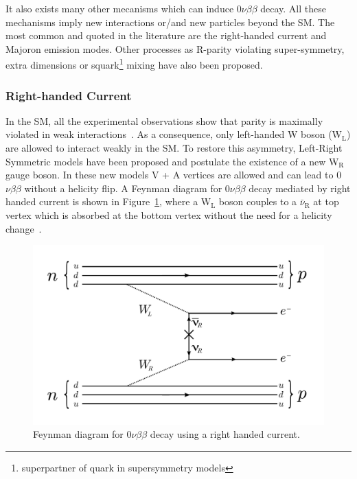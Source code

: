 \documentclass[main.tex]{subfiles}
\begin{document}
\NI It also exists many other mecanisms which can induce 0$\nu\beta\beta$ decay. All these mechanisms imply new interactions or/and new particles beyond the SM.  The most common and quoted in the literature are the right-handed current and Majoron emission modes. Other processes as R-parity violating super-symmetry, extra dimensions or squark\footnote{superpartner of quark in supersymmetry models} mixing have also been proposed.




\subsubsection{Right-handed Current}


\NI In the SM, all the experimental observations show that parity is maximally violated in weak interactions~\cite{Wu,NeutrinoHelicity}. As a consequence,  only left-handed W boson (W$_\text{L}$) are allowed to interact weakly in the SM. To restore this asymmetry, Left-Right Symmetric models have been proposed and postulate the existence of a new W$_\text{R}$ gauge boson. In these new models V + A vertices are allowed and can lead to 0$\nu\beta\beta$ without a helicity flip. A Feynman diagram for 0$\nu\beta\beta$ decay mediated by right handed current is shown in Figure~\ref{OnbbFeynmanDiagramRHC}, where a W$_\text{L}$ boson couples to a $\bar{\nu}_\text{R}$ at top vertex which is absorbed at the bottom vertex without the need for a helicity change~\cite{DBDRightHandedCurrent}.


\begin{figure}[h!]
\begin{center}
\includegraphics[scale=0.45]{pictures/Chap2/0nubbFeynmanDiagram_RHC.pdf}
\caption{Feynman diagram for 0$\nu\beta\beta$ decay using a right handed current.}
\label{OnbbFeynmanDiagramRHC}
\end{center}
\end{figure}
\end{document}
